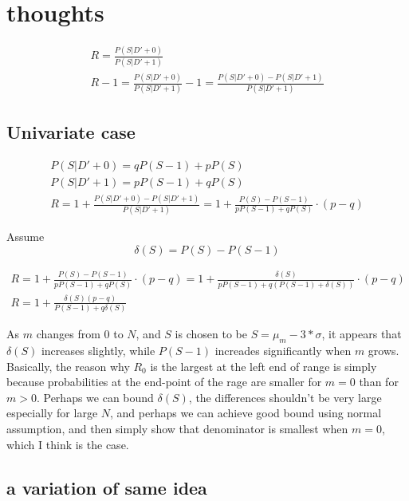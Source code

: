 \documentclass[11pt,draft]{article}
\title{}
\author{Maxim Zhilyaev \and David Zeber}
\begin{document}
\maketitle

\section{thoughts}

\begin{align}
R = \frac{P(S|D'+0)}{P(S|D'+1)} \\
R - 1 =   \frac{P(S|D'+0)}{P(S|D'+1)}  - 1 = \frac{P(S|D'+0) - P(S|D'+1)}{P(S|D'+1)}
\end{align}
 
\subsection{Univariate case}

\begin{align}
P(S|D'+0) = qP(S-1) + pP(S)\\
P(S|D'+1) = pP(S-1) + qP(S)\\
R = 1 + \frac{P(S|D'+0) - P(S|D'+1)}{P(S|D'+1)} = 1 + \frac{ P(S) - P(S-1)}{ pP(S-1) + qP(S) } \cdot (p-q) 
\end{align}

Assume \[ \delta(S) = P(S) - P(S-1) \]

\begin{align}
R = 1 + \frac{ P(S) - P(S-1)}{ pP(S-1) + qP(S) } \cdot (p-q)  = 1 +  \frac{ \delta(S) }{ pP(S-1) + q(P(S-1) + \delta(S)) } \cdot (p-q) \\
R = 1 +  \frac{\delta(S) (p-q) }{ P(S-1) + q\delta(S)}
\end{align}

As $m$ changes from $0$ to $N$,  and $S$ is chosen to be $S=\mu_m - 3*\sigma$, it appears that $\delta(S)$ increases slightly, while $P(S-1)$ increades significantly when $m$ grows.
Basically, the reason why $R_0$ is the largest at the left end of range is simply because  probabilities at the end-point of the rage are smaller for $m=0$ than for $m>0$.
Perhaps we can bound $\delta(S)$, the differences shouldn't be very large especially for large $N$, and perhaps we can achieve good bound using normal assumption, and then simply show that denominator is smallest when $m=0$, which I think is the case.

\subsection{a variation of same idea}
\end{document}
